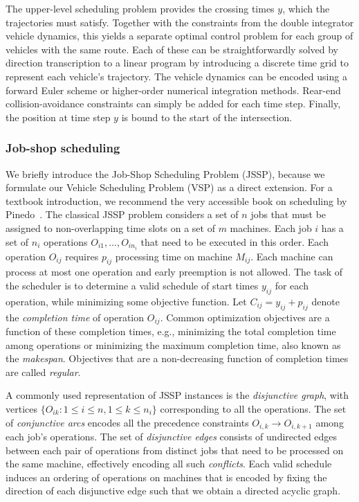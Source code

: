 \documentclass{article}
\theoremstyle{definition}
\theoremstyle{plain}
\begin{document}
The upper-level scheduling problem provides the crossing times $y$,
which the trajectories must satisfy. Together with the constraints from the
double integrator vehicle dynamics, this yields a separate optimal control
problem for each group of vehicles with the same route.
Each of these can be straightforwardly solved by direction transcription to a
linear program by introducing a discrete time grid to represent each vehicle's
trajectory. The vehicle dynamics can be encoded using a forward Euler scheme or
higher-order numerical integration methods. Rear-end collision-avoidance
constraints can simply be added for each time step. Finally, the position at
time step $y$ is bound to the start of the intersection.


\subsubsection{Job-shop scheduling}

We briefly introduce the Job-Shop Scheduling Problem (JSSP), because we
formulate our Vehicle Scheduling Problem (VSP) as a direct extension. For a
textbook introduction, we recommend the very accessible book on scheduling by
Pinedo~\cite{pinedoSchedulingTheoryAlgorithms2016}.
%
The classical JSSP problem considers a set of $n$ jobs that must be assigned to
non-overlapping time slots on a set of $m$ machines. Each job $i$ has a set of
$n_{i}$ operations $O_{i1}, \dots, O_{in_{i}}$ that need to be executed in this
order. Each operation $O_{ij}$ requires $p_{ij}$ processing time on machine
$M_{ij}$. Each machine can process at most one operation and early preemption is
not allowed. The task of the scheduler is to determine a valid schedule of start
times $y_{ij}$ for each operation, while minimizing some objective function. Let
$C_{ij} = y_{ij} + p_{ij}$ denote the \textit{completion time} of operation $O_{ij}$.
Common optimization objectives are a function of these completion times, e.g.,
minimizing the total completion time among operations or minimizing the maximum
completion time, also known as the \textit{makespan}. Objectives that are a
non-decreasing function of completion times are called \textit{regular}.

A commonly used representation of JSSP instances is the \textit{disjunctive
  graph}, with vertices $\{ O_{ik} : 1 \leq i \leq n, 1 \leq k \leq n_{i} \}$
corresponding to all the operations. The set of \textit{conjunctive arcs} encodes
all the precedence constraints $O_{i,k} \rightarrow O_{i,k+1} $ among each job's
operations. The set of \textit{disjunctive edges} consists of undirected edges
between each pair of operations from distinct jobs that need to be processed on
the same machine, effectively encoding all such \textit{conflicts}. Each valid
schedule induces an ordering of operations on machines that is encoded by fixing
the direction of each disjunctive edge such that we obtain a directed acyclic
graph.
\end{document}
